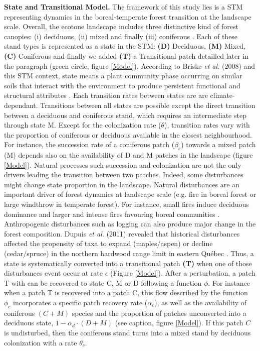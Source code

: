 \textbf{State and Transitional Model.} The framework of this study lies is a
STM representing dynamics in the boreal-temperate forest transition at the
landscape scale.  Overall, the ecotone landscape includes three distinctive
kind of forest canopies: (i) deciduous, (ii) mixed and finally (iii)
coniferous \cite{Fisichelli2013}.  Each of these stand types is represented as
a state in the STM: \textbf{(D)} Deciduous, \textbf{(M)} Mixed, \textbf{(C)}
Coniferous and finally we added \textbf{(T)} a Transitional patch detailled
later in the paragraph (green circle, figure \ref{Model}).  According to
Briske\textit{ et al.} (2008) and this STM context, state means a plant
community phase occurring on similar soils that interact with the environment
to produce persistent functional and structural attributes \cite{Briske2008}.
Each transition rates between states are  are climate-dependant. Transitions
between all states are possible except the direct transition between a
deciduous and coniferous stand, which requires an intermediate step through
state M. Except for the colonization rate ($\theta$), transition rates vary
with the proportion of coniferous or deciduous available in the closest
neighbourhood. For instance, the succession rate of a coniferous patch
($\beta_c$) towards a mixed patch (M) depends also on the availability of D
and M patches in the landscape (figure \ref{Model}).  Natural processes such
succession and colonization  are not the only drivers leading the transition
between two patches. Indeed, some disturbances might change state proportion
in the landscape. Natural disturbances are an important driver of forest
dynamics at landscape scale (e.g. fire in boreal forest or large windthrow in
temperate forest). For instance, small fires induce deciduous dominance and
larger and intense fires favouring boreal communities \cite{Bergeron2004}.
Anthropogenic disturbances such as logging can also produce major change in
the forest composition. Dupuis \textit{et al.} (2011) revealed that historical
disturbances affected the propensity of taxa to expand (maples/aspen) or
decline (cedar/spruce) in the northern hardwood range limit in eastern Québec
\cite{Dupuis2011}. Thus, a state is systematically converted into a
transitional patch \textbf{(T)} when one of those disturbances event occur at
rate $\epsilon$ (Figure \ref{Model}). After a perturbation, a patch T with can
be recovered to state C, M or D following a function $\phi$. For instance when
a patch T is recovered into a patch C, this flow described by the function
$\phi_c$ incorporates a specific patch recovery rate ($\alpha_c$), as well as
the availability of coniferous $(C + M)$ species and the proportion of patches
unconverted into a deciduous state, $1- \alpha_d \cdot (D + M)$ (see caption,
figure \ref{Model}). If this patch $C$ is undisturbed, then the coniferous
stand turns into a mixed stand by deciduous colonization with a rate
$\theta_c$.


